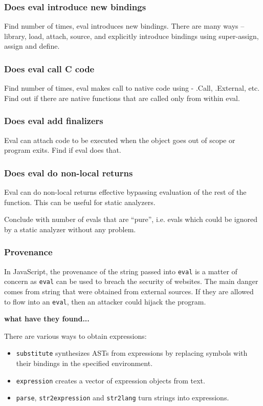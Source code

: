 \documentclass[USenglish,cleveref, autoref, thm-restate]{lipics-v2019}
\newcommand{\eval}{\texttt{eval}\xspace}
\renewcommand{\c}[1]{\lstinline{#1}\xspace}
\begin{document}
\subsubsection{Does eval introduce new bindings}
Find number of times, eval introduces new bindings. There are many ways -- library,
load, attach, source, and explicitly introduce bindings using super-assign, assign and define.

\subsubsection{Does eval call C code}
Find number of times, eval makes call to native code using - .Call, .External,
etc. Find out if there are native functions that are called only from within eval.

\subsubsection{Does eval add finalizers}
Eval can attach code to be executed when the object goes out of scope or program
exits. Find if eval does that.

\subsubsection{Does eval do non-local returns}
Eval can do non-local returns effective bypassing evaluation of the rest of the
function. This can be useful for static analyzers.

Conclude with number of evals that are ``pure'', i.e. evals which
could be ignored by a static analyzer without any problem.

\subsubsection{Provenance}

In JavaScript, the provenance of the string passed into \eval is a matter of
concern as \eval can be used to breach the security of websites. The main
danger comes from string that were obtained from external sources. If they
are allowed to flow into an \eval, then an attacker could hijack the
program.

{\bf what have they found...}

There are various ways to obtain expressions:
\begin{itemize}
  \item \c{substitute} synthesizes ASTs from expressions by replacing
    symbols with their bindings in the specified environment.
  \item \c{expression}  creates a vector of expression
    objects from text.
  \item \c{parse}, \c{str2expression} and \c{str2lang} turn strings into
    expressions.
\end{itemize}
\end{document}
